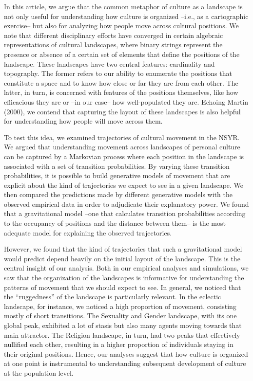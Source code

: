 \documentclass[
  11pt,
]{article}
\begin{document}
In this article, we argue that the common metaphor of culture as a
landscape is not only useful for understanding how culture is organized
--i.e., as a cartographic exercise-- but also for analyzing how people
move across cultural positions. We note that different disciplinary
efforts have converged in certain algebraic representations of cultural
landscapes, where binary strings represent the presence or absence of a
certain set of elements that define the positions of the landscape.
These landscapes have two central features: cardinality and topography.
The former refers to our ability to enumerate the positions that
constitute a space and to know how close or far they are from each
other. The latter, in turn, is concerned with features of the positions
themselves, like how efficacious they are or --in our case-- how
well-populated they are. Echoing Martin (2000), we contend that
capturing the layout of these landscapes is also helpful for
understanding how people will move across them.

To test this idea, we examined trajectories of cultural movement in the
NSYR. We argued that understanding movement across landscapes of
personal culture can be captured by a Markovian process where each
position in the landscape is associated with a set of transition
probabilities. By varying these transition probabilities, it is possible
to build generative models of movement that are explicit about the kind
of trajectories we expect to see in a given landscape. We then compared
the predictions made by different generative models with the observed
empirical data in order to adjudicate their explanatory power. We found
that a gravitational model --one that calculates transition
probabilities according to the occupancy of positions and the distance
between them-- is the most adequate model for explaining the observed
trajectories.

However, we found that the kind of trajectories that such a
gravitational model would predict depend heavily on the initial layout
of the landscape. This is the central insight of our analysis. Both in
our empirical analyses and simulations, we saw that the organization of
the landscapes is informative for understanding the patterns of movement
that we should expect to see. In general, we noticed that the
``ruggedness'' of the landscape is particularly relevant. In the
eclectic landscape, for instance, we noticed a high proportion of
movement, consisting mostly of short transitions. The Sexuality and
Gender landscape, with its one global peak, exhibited a lot of stasis
but also many agents moving towards that main attractor. The Religion
landscape, in turn, had two peaks that effectively nullified each other,
resulting in a higher proportion of individuals staying in their
original positions. Hence, our analyses suggest that how culture is
organized at one point is instrumental to understanding subsequent
development of culture at the population level.
\end{document}
